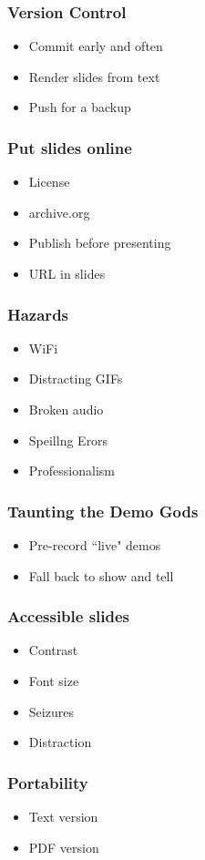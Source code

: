\documentclass{beamer}
\begin{document}
\begin{frame}[fragile]
\frametitle{Version Control}
\begin{itemize}
\item Commit early and often
\item Render slides from text
\item Push for a backup
\end{itemize}
\end{frame}

\begin{frame}[fragile]
\frametitle{Put slides online}
\begin{itemize}
\item License
\item archive.org
\item Publish before presenting
\item URL in slides
\end{itemize}
\end{frame}

\begin{frame}[fragile]
\frametitle{Hazards}
\begin{itemize}
\item WiFi
\item Distracting GIFs
\item Broken audio
\item Speillng Erors
\item Professionalism
\end{itemize}
\end{frame}

\begin{frame}[fragile]
\frametitle{Taunting the Demo Gods}
\begin{itemize}
\item Pre-record ``live" demos
\item Fall back to show and tell
\end{itemize}
\end{frame}

\begin{frame}[fragile]
\frametitle{Accessible slides}
\begin{itemize}
\item Contrast
\item Font size
\item Seizures
\item Distraction
\end{itemize}
\end{frame}

\begin{frame}[fragile]
\frametitle{Portability}
\begin{itemize}
\item Text version
\item PDF version
\end{itemize}
\end{frame}
\end{document}
